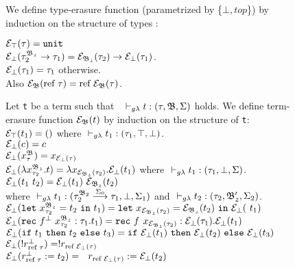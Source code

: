 \begin{figure}[H]
\hrulefill
\begin{dfn} 
\label{type-erasure}
We define type-erasure function (parametrized by \{$\bot, top$\})  
by induction on the structure of types : \vspace{0.2cm} 

\noindent$ \mathcal{E}_{\top}(\tau) = \texttt{unit} $ \\
\noindent$ 
\mathcal{E}_{\bot}(\tau_{2}^{\mathfrak{B_{2}}} \rightarrow \tau_{1})  
= \mathcal{E}_{\mathfrak{B_{2}}}(\tau_{2}) \rightarrow \mathcal{E}_{\bot}(\tau_{1}) $. \\
\noindent$ \mathcal{E}_{\bot}(\tau_{1}) = \tau_{1}$ \qquad\qquad otherwise.\\

Also $\mathcal{E}_{\mathfrak{B}}(\text{ref } \tau) = \text{ref } \mathcal{E}_{\mathfrak{B}}(\tau) $.\\
\end{dfn}

\begin{dfn}
Let \texttt{t} be a term such that 
~$\typrule{t}{\tau}{\mf{B}}{\Sigma}$ holds. 
We define term-erasure function 
$\mathcal{E}_{\mathfrak{B}}(t)$ by induction on 
the structure of \texttt{t}: \\[0.1cm]
\noindent$ \mathcal{E}_{\top}(t_1) = () $ 
\quad where $ \typrule{t_{1}}{\tau_{1}}{\top}{\bot}$.\\
\noindent$ \mathcal{E}_{\bot}(c) = c $\\
\noindent$ \mathcal{E}_{\bot}(x^{\mathfrak{B_{}}}_{\tau_{}}) = x_{\mathcal{E}_{\bot}(\tau)} $\\
\noindent$ \mathcal{E}_{\bot}(\lambda x^{\mathfrak{B_{2}}}_{\tau_{2}}. t) =  
\lambda x_{\mathcal{E}_{\mathfrak{B_{2}}}(\tau_{2})}. \mathcal{E}_{\bot}(t_{1})$
\quad where $ \typrule{t_{1}}{\tau_{1}}{\bot}{\Sigma}$.\\
\noindent$ 
\mathcal{E}_{\bot}(t_1~t_2) =\mathcal{E}_{\bot}(t_{1})~\mathcal{E}_{\mathfrak{B_{2}}}(t_{2})$ \\
where 
$\typrule{t_{1}}
	{\tau_{2}^{\mf{B}_{2}} 
	\stackrel{\Sigma_{0}}{\longrightarrow} \tau_{1}}
	{\bot}{\Sigma_1}$ and 
$ \typrule{t_{2}}{\tau_{2}}{\mf{B'_{2}}}{\Sigma_2}$.\\
\noindent
$\mathcal{E}_{\bot}(\mathtt{let}~x^{\mathfrak{B_{2}}}_{\tau_{2}}= t_2~\mathtt{in}~t_1) = 
\mathtt{let}~x_{\mathcal{E}_{\mathfrak{B_2}}(\tau_2)} = \mathcal{E}_{\mathfrak{B_2}}(t_2) ~\mathtt{in}~\mathcal{E}_{\bot}(~t_1)
 $\\
\noindent
$\mathcal{E}_{\bot}
(\mathtt{rec}~f^{\bot}_{}~x^{\mathfrak{B_{2}}}_{\tau_{2}}:\tau_{1}. t_1)
= 
\mathtt{rec}~f^{}_{}~x_{\mathcal{E}_{\mathfrak{B_{2}}}(\tau_{2})}:\mathcal{E}_{\bot}(\tau_{1}). \mathcal{E}_{\bot}(t_1)$\\
\noindent
$\mathcal{E}_{\bot}(\mathtt{if}~t_1~\mathtt{then}~t_2~\mathtt{else}~t_3) 
=
\mathtt{if}~\mathcal{E}_{\bot}(t_1)~
\mathtt{then}~\mathcal{E}_{\bot}(t_2)~
\mathtt{else}~\mathcal{E}_{\bot}(t_3)$ \\
\noindent
$\mathcal{E}_{\bot}(!r^{\bot}_{\text{ref } \tau}) 
= !r_{\text{ref }\mathcal{E}_{\bot}(\tau)} $ \\
\noindent
$\mathcal{E}_{\bot}(r^{\bot}_{\text{ref }\tau} := t_2) = ~~
r_{\text{ref } \mathcal{E}_{\bot}(\tau)} := \mathcal{E}_{\bot}(t_2)$\\
\end{dfn}


\end{figure}
